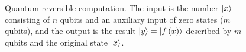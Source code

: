 \begin{figure}
\centering



\caption{Quantum reversible computation. The input is the number
  $\ket{x}$ consisting of $n$ qubits and an auxiliary input of zero
  states ($m$ qubits), and the output is the result $\ket{y} =
  \left|f\left(x\right)\right>$ described by $m$ qubits and the original
  state $\ket{x}$.}
\label{figQuantCompQuantComp}
\end{figure}
